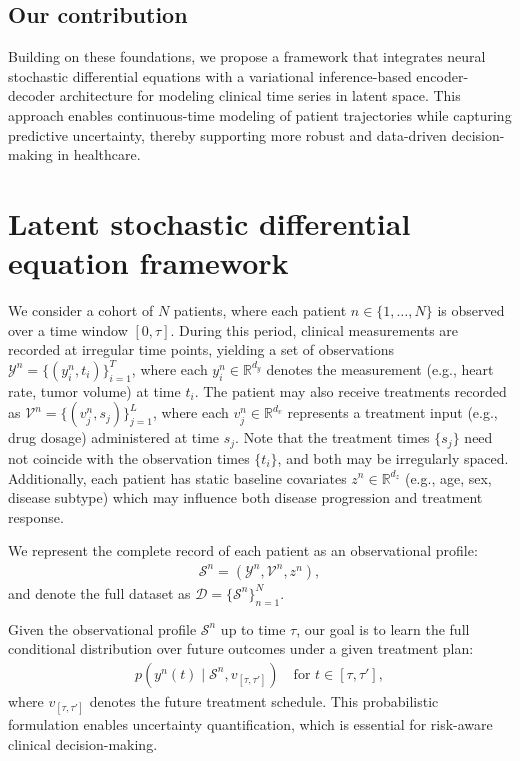 \documentclass[preprint,12pt]{elsarticle}
\begin{document}
\subsection{Our contribution}
Building on these foundations, we propose a framework that integrates neural stochastic differential equations with a variational inference-based encoder-decoder architecture for modeling clinical time series in latent space. This approach enables continuous-time modeling of patient trajectories while capturing predictive uncertainty, thereby supporting more robust and data-driven decision-making in healthcare.



\section{Latent stochastic differential equation framework}
\label{sec:framework}

We consider a cohort of $N$ patients, where each patient $n \in \{1, \ldots, N\}$ is observed over a time window $[0, \tau]$. During this period, clinical measurements are recorded at irregular time points, yielding a set of observations $\mathcal{Y}^n = \{(y^n_i, t_i)\}_{i=1}^{T}$, where each $y^n_i \in \mathbb{R}^{d_y}$ denotes the measurement (e.g., heart rate, tumor volume) at time $t_i$. The patient may also receive treatments recorded as $\mathcal{V}^n = \{(v^n_j, s_j)\}_{j=1}^{L}$, where each $v^n_j \in \mathbb{R}^{d_v}$ represents a treatment input (e.g., drug dosage) administered at time $s_j$. Note that the treatment times $\{s_j\}$ need not coincide with the observation times $\{t_i\}$, and both may be irregularly spaced. Additionally, each patient has static baseline covariates $z^n \in \mathbb{R}^{d_z}$ (e.g., age, sex, disease subtype) which may influence both disease progression and treatment response.

We represent the complete record of each patient as an observational profile:
\begin{align}
    \mathcal{S}^n = (\mathcal{Y}^n, \mathcal{V}^n, z^n),
\end{align}
and denote the full dataset as $\mathcal{D} = \{\mathcal{S}^n\}_{n=1}^{N}$.

Given the observational profile $\mathcal{S}^n$ up to time $\tau$, our goal is to learn the full conditional distribution over future outcomes under a given treatment plan:
\begin{align}
    p\left(y^n(t) \mid \mathcal{S}^n, v_{[\tau, \tau']}\right) \quad \text{for } t \in [\tau, \tau'],
\end{align}
where $v_{[\tau, \tau']}$ denotes the future treatment schedule. This probabilistic formulation enables uncertainty quantification, which is essential for risk-aware clinical decision-making.
\end{document}
